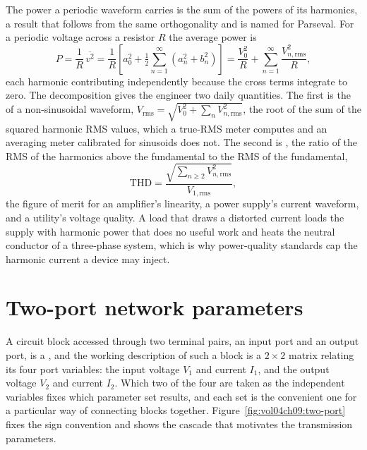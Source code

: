 The power a periodic waveform carries is the sum of the powers of its
harmonics, a result that follows from the same orthogonality and is named
for Parseval. For a periodic voltage across a resistor $R$ the average
power is
\[
P = \frac{1}{R}\,\overline{v^{2}}
= \frac{1}{R}\left[a_0^{2} + \tfrac{1}{2}\sum_{n=1}^{\infty}
(a_n^{2} + b_n^{2})\right]
= \frac{V_0^{2}}{R} + \sum_{n=1}^{\infty}\frac{V_{n,\text{rms}}^{2}}{R},
\]
each harmonic contributing independently because the cross terms
integrate to zero. The decomposition gives the engineer two daily
quantities. The first is the  of a non-sinusoidal
waveform, $V_{\text{rms}} = \sqrt{V_0^{2} + \sum_n V_{n,\text{rms}}^{2}}$,
the root of the sum of the squared harmonic RMS values, which a
true-RMS meter computes and an averaging meter calibrated for sinusoids
does not. The second is , the ratio of
the RMS of the harmonics above the fundamental to the RMS of the
fundamental,
\[
\text{THD} = \frac{\sqrt{\sum_{n\geq 2} V_{n,\text{rms}}^{2}}}
{V_{1,\text{rms}}},
\]
the figure of merit for an amplifier's linearity, a power supply's
current waveform, and a utility's voltage quality. A load that draws a
distorted current loads the supply with harmonic power that does no useful
work and heats the neutral conductor of a three-phase system, which is why
power-quality standards cap the harmonic current a device may inject.

\section{Two-port network parameters}
\label{sec:vol04ch09:two-port}

A circuit block accessed through two terminal pairs, an input port and an
output port, is a , and the working description of such
a block is a $2\times 2$ matrix relating its four port variables: the
input voltage $V_1$ and current $I_1$, and the output voltage $V_2$ and
current $I_2$. Which two of the four are taken as the independent
variables fixes which parameter set results, and each set is the
convenient one for a particular way of connecting blocks together.
Figure~\ref{fig:vol04ch09:two-port} fixes the sign convention and shows
the cascade that motivates the transmission parameters.



